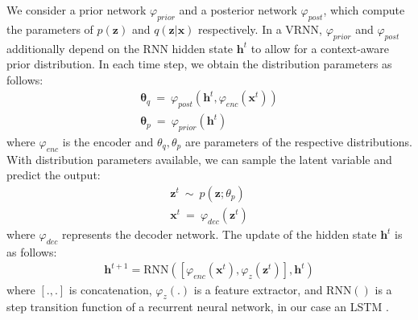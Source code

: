 We consider a prior network $\varphi_{prior}$ and a posterior network $\varphi_{post}$, which compute the parameters of $p(\mathbf{z})$ and $q(\mathbf{z}|\mathbf{x})$ respectively.
In a VRNN, $\varphi_{prior}$ and $\varphi_{post}$ additionally depend on the RNN hidden state $\mathbf{h}^t$ to allow for a context-aware prior distribution.
In each time step, we obtain the distribution parameters as follows:
\begin{equation}
\label{eq:distr_theta}
\begin{gathered}
    \mathbf{\theta}_{q}~=~\varphi_{post}(\mathbf{h}^t, \varphi_{enc}(\mathbf{x}^t))\\
    \mathbf{\theta}_{p}~=~\varphi_{prior}(\mathbf{h}^t)
\end{gathered}
\end{equation}
where $\varphi_{enc}$ is the encoder and $\theta_q, \theta_p$ are parameters of the respective distributions.
With distribution parameters available, we can sample the latent variable and predict the output:
\begin{equation}
\label{eq:x_infer}
\begin{gathered}
    \mathbf{z}^t~\mathtt{\sim}~p(\mathbf{z};\theta_{p})\\
    \mathbf{x}^t~=~ \varphi_{dec}(\mathbf{z}^t)
\end{gathered}
\end{equation}
where $\varphi_{dec}$ represents the decoder network.
The update of the hidden state $\mathbf{h}^t$ is as follows:
\begin{equation}
    \label{eq:hidden_update}
    \begin{gathered}
        \mathbf{h}^{t+1} = \text{RNN}([\varphi_{enc}(\mathbf{x}^t),\varphi_{z}(\mathbf{z}^t)], \mathbf{h}^t)
    \end{gathered}
\end{equation}
where $[.,.]$ is concatenation, $\varphi_z(.)$ is a feature extractor, and $\text{RNN}()$ is a step transition function of a recurrent neural network, in our case an LSTM \cite{hochreiter1997}.

